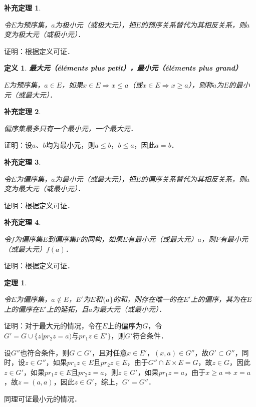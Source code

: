 \documentclass[12pt, a4paper, oneside]{book}
\newtheorem{theo}{定理}
\newtheorem{cor}{补充定理}
\newtheorem{de}{定义}
\begin{document}
			\begin{cor}\label{cor170}
				\hfill\par
				令$E$为预序集，$a$为极小元（或极大元），把$E$的预序关系替代为其相反关系，则$a$变为极大元（或极小元）．
			\end{cor}
			证明：根据定义可证．
			
			\begin{de}
				\textbf{最大元（éléments plus petit），最小元（éléments plus grand）}
				\par
				$E$为预序集，$a\in E$，如果$x\in E\Rightarrow x\leq a$（或$x\in E\Rightarrow x\geq a$），则称$a$为$E$的最小元（或最大元）．
			\end{de}

			\begin{cor}\label{cor171}
				\hfill\par
				偏序集最多只有一个最小元，一个最大元．
			\end{cor}
			证明：设$a$、$b$均为最小元，则$a\leq b$，$b\leq a$，因此$a=b$．
			
			\begin{cor}\label{cor172}
				\hfill\par
				令$E$为偏序集，$a$为最小元（或最大元），把$E$的偏序关系替代为其相反关系，则$a$变为最大元（或最小元）．
			\end{cor}
			证明：根据定义可证．
			
			\begin{cor}\label{cor173}
				\hfill\par
				令$f$为偏序集$E$到偏序集$F$的同构，如果$E$有最小元（或最大元）$a$，则$F$有最小元（或最大元）$f(a)$．
			\end{cor}
			证明：根据定义可证．

			\begin{theo}\label{theo59}
				\hfill\par
				令$E$为偏序集，$a\notin E$，$E'$为$E$和$\{a\}$的和，则存在唯一的在$E'$上的偏序，其为在$E$上的偏序在$E'$上的延拓，且$a$为最大元（或最小元）．
			\end{theo}
			证明：对于最大元的情况，令在$E$上的偏序为$G$，令$G'=G\cup \{z|pr_2z=a)\text{与}pr_1z\in E'\}$，则$G'$符合条件．
			\par
			设$G''$也符合条件，则$G\subset G'$，且对任意$x\in E'$，$(x, a)\in G''$，故$G'\subset G''$，同时，设$z\in G''$，如果$pr_1z\in E$且$pr_2z\in E$，由于$G''\cap E\times E=G$，故$z\in G$，因此$z\in G'$，如果$pr_1z\in E$且$pr_2z=a$，则$z\in G'$，如果$pr_1z=a$，由于$x\geq a\Rightarrow x=a$，故$z=(a, a)$，因此$z\in G'$，综上，$G'=G''$．
			\par
			同理可证最小元的情况．
\end{document}
